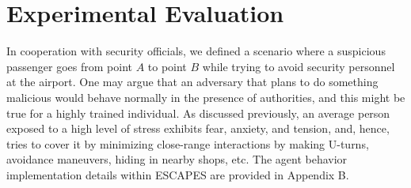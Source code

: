 %
%
\section{Experimental Evaluation}
\label{sec:Experiments}
\noindent
In cooperation with security officials, we defined a scenario where a suspicious passenger goes from point $A$ to point $B$ while trying to avoid security personnel at the airport. One may argue that an adversary that plans to do something malicious would behave normally in the presence of authorities, and this might be true for a highly trained individual. As discussed previously, an average person exposed to a high level of stress exhibits fear, anxiety, and tension, and, hence, tries to cover it by minimizing close-range interactions by making U-turns, avoidance maneuvers, hiding in nearby shops, etc. The agent behavior implementation details within ESCAPES are provided in Appendix B.


